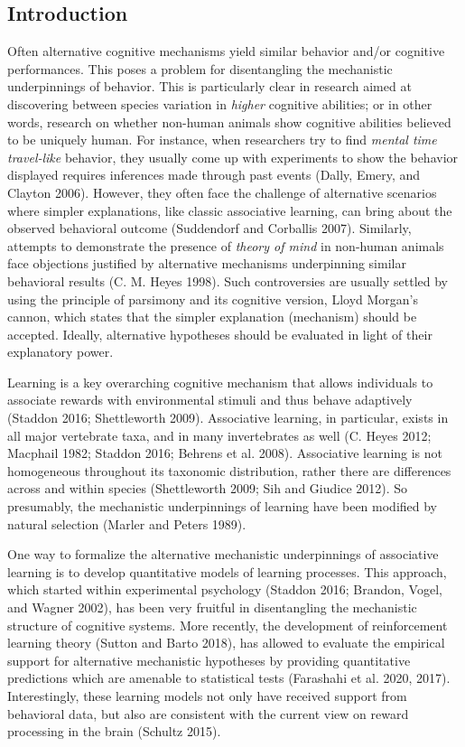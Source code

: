 \documentclass[
  12pt,
]{article}
\begin{document}
\hypertarget{introduction}{%
\subsection{Introduction}\label{introduction}}

Often alternative cognitive mechanisms yield similar behavior and/or
cognitive performances. This poses a problem for disentangling the
mechanistic underpinnings of behavior. This is particularly clear in
research aimed at discovering between species variation in \emph{higher}
cognitive abilities; or in other words, research on whether non-human
animals show cognitive abilities believed to be uniquely human. For
instance, when researchers try to find \emph{mental time travel-like}
behavior, they usually come up with experiments to show the behavior
displayed requires inferences made through past events (Dally, Emery,
and Clayton 2006). However, they often face the challenge of alternative
scenarios where simpler explanations, like classic associative learning,
can bring about the observed behavioral outcome (Suddendorf and
Corballis 2007). Similarly, attempts to demonstrate the presence of
\emph{theory of mind} in non-human animals face objections justified by
alternative mechanisms underpinning similar behavioral results (C. M.
Heyes 1998). Such controversies are usually settled by using the
principle of parsimony and its cognitive version, Lloyd Morgan's cannon,
which states that the simpler explanation (mechanism) should be
accepted. Ideally, alternative hypotheses should be evaluated in light
of their explanatory power.

Learning is a key overarching cognitive mechanism that allows
individuals to associate rewards with environmental stimuli and thus
behave adaptively (Staddon 2016; Shettleworth 2009). Associative
learning, in particular, exists in all major vertebrate taxa, and in
many invertebrates as well (C. Heyes 2012; Macphail 1982; Staddon 2016;
Behrens et al. 2008). Associative learning is not homogeneous throughout
its taxonomic distribution, rather there are differences across and
within species (Shettleworth 2009; Sih and Giudice 2012). So presumably,
the mechanistic underpinnings of learning have been modified by natural
selection (Marler and Peters 1989).

One way to formalize the alternative mechanistic underpinnings of
associative learning is to develop quantitative models of learning
processes. This approach, which started within experimental psychology
(Staddon 2016; Brandon, Vogel, and Wagner 2002), has been very fruitful
in disentangling the mechanistic structure of cognitive systems. More
recently, the development of reinforcement learning theory (Sutton and
Barto 2018), has allowed to evaluate the empirical support for
alternative mechanistic hypotheses by providing quantitative predictions
which are amenable to statistical tests (Farashahi et al. 2020, 2017).
Interestingly, these learning models not only have received support from
behavioral data, but also are consistent with the current view on reward
processing in the brain (Schultz 2015).
\end{document}
